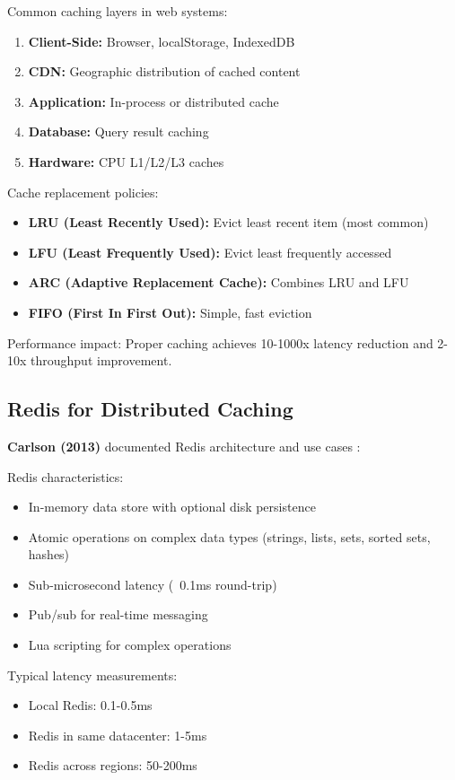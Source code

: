 \documentclass[conference]{IEEEtran}
\begin{document}
Common caching layers in web systems:
\begin{enumerate}
    \item \textbf{Client-Side:} Browser, localStorage, IndexedDB
    \item \textbf{CDN:} Geographic distribution of cached content
    \item \textbf{Application:} In-process or distributed cache
    \item \textbf{Database:} Query result caching
    \item \textbf{Hardware:} CPU L1/L2/L3 caches
\end{enumerate}

Cache replacement policies:
\begin{itemize}
    \item \textbf{LRU (Least Recently Used):} Evict least recent item (most common)
    \item \textbf{LFU (Least Frequently Used):} Evict least frequently accessed
    \item \textbf{ARC (Adaptive Replacement Cache):} Combines LRU and LFU
    \item \textbf{FIFO (First In First Out):} Simple, fast eviction
\end{itemize}

Performance impact: Proper caching achieves 10-1000x latency reduction and 2-10x throughput improvement.

\subsection{Redis for Distributed Caching}

\textbf{Carlson (2013)} documented Redis architecture and use cases \cite{carlson2013redis}:

Redis characteristics:
\begin{itemize}
    \item In-memory data store with optional disk persistence
    \item Atomic operations on complex data types (strings, lists, sets, sorted sets, hashes)
    \item Sub-microsecond latency (~0.1ms round-trip)
    \item Pub/sub for real-time messaging
    \item Lua scripting for complex operations
\end{itemize}

Typical latency measurements:
\begin{itemize}
    \item Local Redis: 0.1-0.5ms
    \item Redis in same datacenter: 1-5ms
    \item Redis across regions: 50-200ms
\end{itemize}
\end{document}
